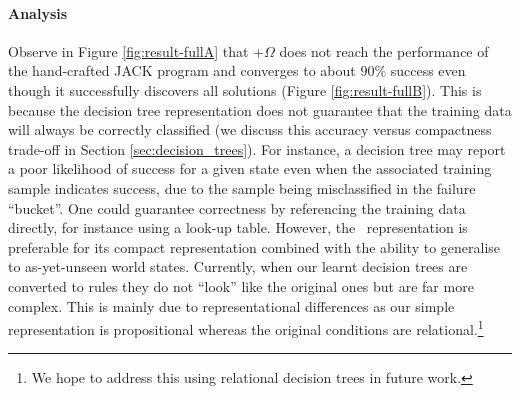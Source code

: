 \paragraph{Analysis} Observe in Figure \ref{fig:result-fullA} that \CL+$\Omega$ does not reach the performance of the hand-crafted JACK program and converges to about $90\%$ success even though it successfully discovers all solutions (Figure \ref{fig:result-fullB}).
This is because the decision tree representation does not guarantee that the training data will always be correctly classified (we discuss this accuracy versus compactness trade-off in Section \ref{sec:decision_trees}). For instance, a decision tree may report a poor likelihood of success for a given state even when the associated training sample indicates success, due to the sample being misclassified in the failure ``bucket''.
One could guarantee correctness by referencing the training data directly, for instance using a look-up table. However, the \dt\ representation is preferable for its compact representation combined with the ability to generalise to as-yet-unseen world states.
%
Currently, when our learnt decision trees are converted to rules they do not ``look'' like the original ones but are far more complex. This is mainly due to representational differences as our simple representation is propositional whereas the original conditions are relational.\footnote{We hope to address this using relational decision trees in future work.}
